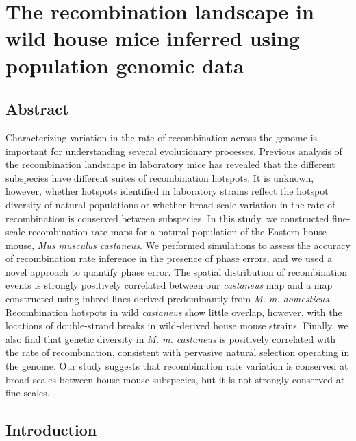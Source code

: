 \chapter{The recombination landscape in wild house mice inferred using population genomic data}



\section{Abstract}
 
Characterizing variation in the rate of recombination across the genome is important for understanding several evolutionary processes. Previous analysis of the recombination landscape in laboratory mice has revealed that the different subspecies have different suites of recombination hotspots. It is unknown, however, whether hotspots identified in laboratory strains reflect the hotspot diversity of natural populations or whether broad-scale variation in the rate of recombination is conserved between subspecies. In this study, we constructed fine-scale recombination rate maps for a natural population of the Eastern house mouse, \textit{Mus musculus castaneus}. We performed simulations to assess the accuracy of recombination rate inference in the presence of phase errors, and we used a novel approach to quantify phase error. The spatial distribution of recombination events is strongly positively correlated between our \textit{castaneus} map and a map constructed using inbred lines derived predominantly from \textit{M. m. domesticus}. Recombination hotspots in wild \textit{castaneus} show little overlap, however, with the locations of double-strand breaks in wild-derived house mouse strains. Finally, we also find that genetic diversity in \textit{\textit{M. m. castaneus}} is positively correlated with the rate of recombination, consistent with pervasive natural selection operating in the genome. Our study suggests that recombination rate variation is conserved at broad scales between house mouse subspecies, but it is not strongly conserved at fine scales.

\section{Introduction}
 
